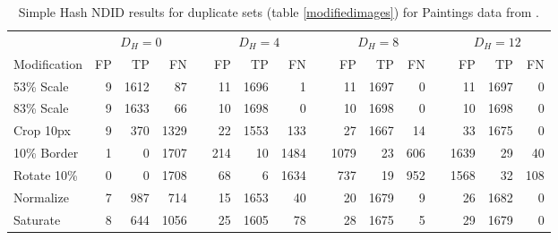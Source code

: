 \documentclass[english,12pt,a4paper,pdftex,elec,utf8]{aaltothesis}
\begin{document}
\begin{table}[htb]\footnotesize
\caption{ Simple Hash NDID results for duplicate sets (table \ref{modifiedimages}) for Paintings data from \cite{Vedaldi2012}. }
\label{simpleresults}
\begin{center}
  \setlength\tabcolsep{3pt} %
  \begin{tabular}{@{}lrrrrrrrrrrrrrrr@{}}
    \toprule
    & \multicolumn{3}{c}{$D_H = 0$} &\phantom{abc} &\multicolumn{3}{c}{$D_H = 4$} &\phantom{abc} & \multicolumn{3}{c}{$D_H=8$} &\phantom{abc} & \multicolumn{3}{c}{$D_H=12$}\\
\cmidrule{2-4} \cmidrule{6-8} \cmidrule{10-12} \cmidrule{14-16}
    Modification & FP & TP & FN &\phantom{abc} & FP & TP & FN &\phantom{abc} & FP & TP & FN &\phantom{abc} & FP & TP & FN\\ \midrule
    53\% Scale   & 9 & 1612 & 87 &\phantom{abc} & 11 & 1696 & 1 &\phantom{abc} & 11 & 1697 & 0 &\phantom{abc} & 11 & 1697 & 0\\
    83\% Scale   & 9 & 1633 & 66 &\phantom{abc} & 10 & 1698 & 0 &\phantom{abc} & 10 & 1698 & 0 &\phantom{abc} & 10 & 1698 & 0\\
    Crop 10px    & 9 & 370 & 1329 &\phantom{abc} & 22 & 1553 & 133 &\phantom{abc} & 27 & 1667 & 14 &\phantom{abc} & 33 & 1675 & 0\\
    10\% Border  & 1 & 0 & 1707 & \phantom{abc} & 214 & 10 & 1484 &\phantom{abc} & 1079 & 23 & 606 &\phantom{abc} & 1639 & 29 & 40\\
    Rotate 10\%  & 0 & 0 & 1708 &\phantom{abc} & 68 & 6 & 1634 &\phantom{abc} & 737 & 19 & 952 &\phantom{abc} & 1568 & 32 & 108\\
    Normalize    & 7 & 987 & 714 &\phantom{abc} & 15 & 1653 & 40 &\phantom{abc} & 20 & 1679 & 9 &\phantom{abc} & 26 & 1682 & 0\\
    Saturate     & 8 & 644 & 1056 &\phantom{abc} & 25 & 1605 & 78 &\phantom{abc} & 28 & 1675 & 5 &\phantom{abc} & 29 & 1679 & 0\\
    \bottomrule
\end{tabular}
\end{center}
\end{table}
\end{document}
